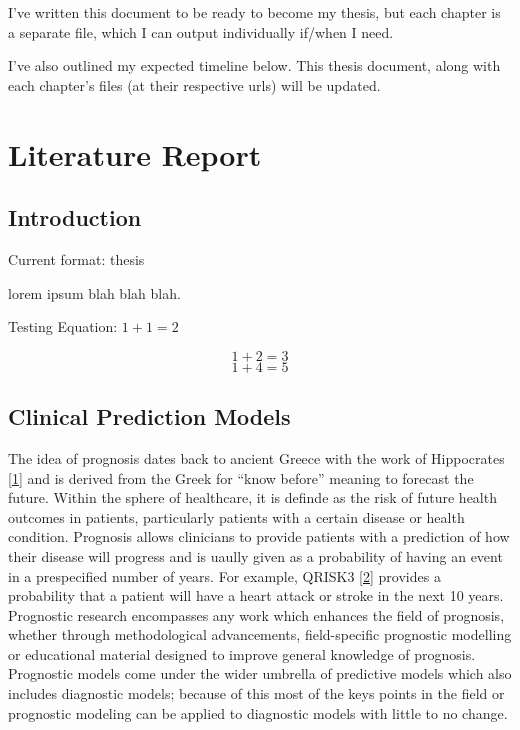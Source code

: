 \documentclass[12pt,PhD,twoside,openright]{muthesis}
\begin{document}
I've written this document to be ready to become my thesis, but each chapter is a separate file, which I can output individually if/when I need.

I've also outlined my expected timeline below. This thesis document, along with each chapter's files (at their respective urls) will be updated.

\hypertarget{chap-lit-report}{%
\chapter{Literature Report}\label{chap-lit-report}}

\hypertarget{introduction-1}{%
\section{Introduction}\label{introduction-1}}

Current format: thesis

lorem ipsum blah blah blah.

Testing Equation: \(1+1=2\)

\[
1 + 2 = 3
\]
\begin{equation}
1 + 4 = 5
\end{equation}
\hypertarget{clinical-prediction-models}{%
\section{Clinical Prediction Models}\label{clinical-prediction-models}}

The idea of prognosis dates back to ancient Greece with the work of Hippocrates {[}\protect\hyperlink{ref-hippocrates_genuine_1886}{1}{]} and is derived from the Greek for ``know before'' meaning to forecast the future. Within the sphere of healthcare, it is definde as the risk of future health outcomes in patients, particularly patients with a certain disease or health condition. Prognosis allows clinicians to provide patients with a prediction of how their disease will progress and is uaully given as a probability of having an event in a prespecified number of years. For example, QRISK3 {[}\protect\hyperlink{ref-hippisley-cox_development_2017}{2}{]} provides a probability that a patient will have a heart attack or stroke in the next 10 years. Prognostic research encompasses any work which enhances the field of prognosis, whether through methodological advancements, field-specific prognostic modelling or educational material designed to improve general knowledge of prognosis. Prognostic models come under the wider umbrella of predictive models which also includes diagnostic models; because of this most of the keys points in the field or prognostic modeling can be applied to diagnostic models with little to no change.
\end{document}
